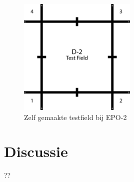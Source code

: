 \documentclass{report}
\begin{document}
\begin{figure}[H]
	\centering
	\includegraphics[width=0.5\textwidth]{d-2_test_field.png}
	\caption{Zelf gemaakte testfield  bij EPO-2}
	\label{fig:testfield}
\end{figure}

\section{Discussie}

??
\end{document}
